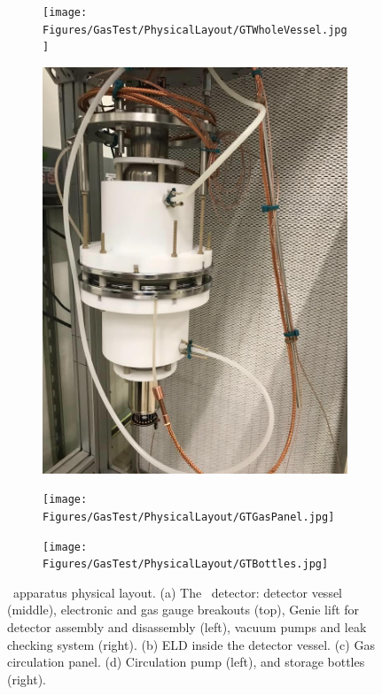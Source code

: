 \begin{figure}[!p]
	\centering
	\begin{subfigure}[b]{\halfwidth}
		\centering
		\texttt{[image: Figures/GasTest/PhysicalLayout/GTWholeVessel.jpg]}
		\caption{}
		\label{fig:chambergeneral:vessel}
	\end{subfigure}
	\begin{subfigure}[b]{\halfwidth}
		\centering
		\includegraphics[width=\figurewidth,clip,trim={0 0 0 0},angle=0,origin=c]{Figures/GasTest/PhysicalLayout/GTGridTestRegion.jpg}
		\caption{}
		\label{fig:chambergeneral:gridtest}
	\end{subfigure}
	\begin{subfigure}[b]{\halfwidth}
		\centering
		\texttt{[image: Figures/GasTest/PhysicalLayout/GTGasPanel.jpg]}
		\caption{}
		\label{fig:chambergeneral:panel}
	\end{subfigure}
	\begin{subfigure}[b]{\halfwidth}
		\centering
		\texttt{[image: Figures/GasTest/PhysicalLayout/GTBottles.jpg]}
		\caption{}
		\label{fig:chambergeneral:bottles}
	\end{subfigure}
	\caption[\gtest\ apparatus physical layout.]{\gtest\ apparatus physical layout. (a) The \gtest\ detector: detector vessel (middle), electronic and gas gauge breakouts (top), Genie lift for detector assembly and disassembly (left), vacuum pumps and leak checking system (right). (b) ELD inside the detector vessel. (c) Gas circulation panel. (d) Circulation pump (left), and storage bottles (right). }
	\label{fig:chambergeneral}
\end{figure}

